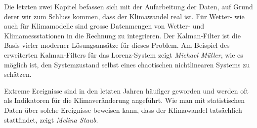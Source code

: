 Die letzten zwei Kapitel befassen sich mit der Aufarbeitung der
Daten, auf Grund derer wir zum Schluss kommen, dass 
der Klimawandel real ist.
Für Wetter- wie auch für Klimamodelle sind grosse Datenmengen
von Wetter- und Klimamessstationen in die Rechnung zu integrieren.
Der Kalman-Filter ist die Basis vieler moderner Lösungsansätze
für dieses Problem.
Am Beispiel des erweiterten Kalman-Filters für das Lorenz-System
zeigt {\em Michael Müller}, wie es möglich ist, den Systemzustand
selbst eines chaotischen nichtlinearen Systems zu schätzen.

Extreme Ereignisse sind in den letzten Jahren häufiger geworden
und werden oft als Indikatoren für die Klimaveränderung angeführt.
Wie man mit statistischen Daten über solche Ereignisse beweisen
kann, dass der Klimawandel tatsächlich stattfindet, zeigt
{\em Melina Staub}.





